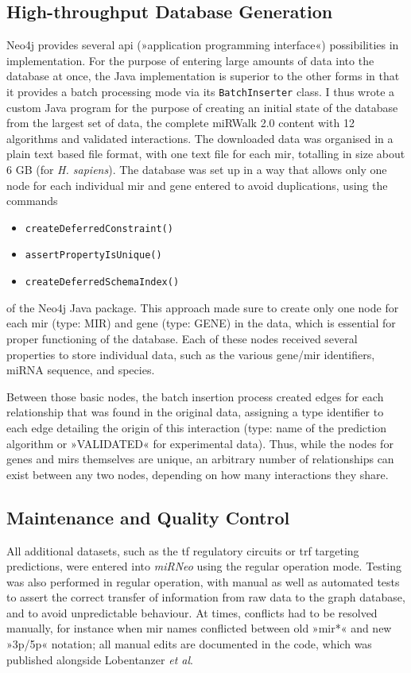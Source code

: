 \subsection{High-throughput Database Generation}
Neo4j provides several \acs{api} (»application programming interface«) possibilities in implementation. For the purpose of entering large amounts of data into the database at once, the Java implementation is superior to the other forms in that it provides a batch processing mode via its \texttt{BatchInserter} class. I thus wrote a custom Java program for the purpose of creating an initial state of the database from the largest set of data, the complete miRWalk 2.0 content with 12 algorithms and validated interactions. The downloaded data was organised in a plain text based file format, with one text file for each \ac{mir}, totalling in size about 6 GB (for \textit{H. sapiens}). The database was set up in a way that allows only one node for each individual \ac{mir} and gene entered to avoid duplications, using the commands 
\begin{itemize}[noitemsep, leftmargin=.5cm, label={\tiny\raisebox{.5ex}{\textbullet}}]
\item \texttt{createDeferredConstraint()}
\item \texttt{assertPropertyIsUnique()}
\item \texttt{createDeferredSchemaIndex()} 
\end{itemize}
of the Neo4j Java package. This approach made sure to create only one node for each \ac{mir} (type: MIR) and gene (type: GENE) in the data, which is essential for proper functioning of the database. Each of these nodes received several properties to store individual data, such as the various gene/\ac{mir} identifiers, miRNA sequence, and species. 

Between those basic nodes, the batch insertion process created edges for each relationship that was found in the original data, assigning a type identifier to each edge detailing the origin of this interaction (type: name of the prediction algorithm or »VALIDATED« for experimental data). Thus, while the nodes for genes and \acp{mir} themselves are unique, an arbitrary number of relationships can exist between any two nodes, depending on how many interactions they share.

\subsection{Maintenance and Quality Control}
All additional datasets, such as the \ac{tf} regulatory circuits or \ac{trf} targeting predictions, were entered into \textit{miRNeo} using the regular operation mode. Testing was also performed in regular operation, with manual as well as automated tests to assert the correct transfer of information from raw data to the graph database, and to avoid unpredictable behaviour. At times, conflicts had to be resolved manually, for instance when \ac{mir} names conflicted between old »\ac{mir}*« and new »3p/5p« notation; all manual edits are documented in the code, which was published alongside Lobentanzer \emph{et al}.\cite{Lobentanzer2019a}

